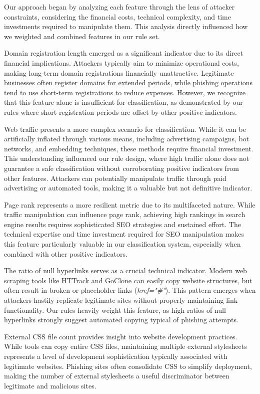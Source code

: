 \documentclass{article}
\begin{document}
Our approach began by analyzing each feature through the lens of attacker constraints, considering the financial costs, technical complexity, and time investments required to manipulate them. This analysis directly influenced how we weighted and combined features in our rule set.

Domain registration length emerged as a significant indicator due to its direct financial implications. Attackers typically aim to minimize operational costs, making long-term domain registrations financially unattractive. Legitimate businesses often register domains for extended periods, while phishing operations tend to use short-term registrations to reduce expenses. However, we recognize that this feature alone is insufficient for classification, as demonstrated by our rules where short registration periods are offset by other positive indicators.

Web traffic presents a more complex scenario for classification. While it can be artificially inflated through various means, including advertising campaigns, bot networks, and embedding techniques, these methods require financial investment. This understanding influenced our rule design, where high traffic alone does not guarantee a safe classification without corroborating positive indicators from other features. Attackers can potentially manipulate traffic through paid advertising or automated tools, making it a valuable but not definitive indicator.

Page rank represents a more resilient metric due to its multifaceted nature. While traffic manipulation can influence page rank, achieving high rankings in search engine results requires sophisticated SEO strategies and sustained effort. The technical expertise and time investment required for SEO manipulation makes this feature particularly valuable in our classification system, especially when combined with other positive indicators.

The ratio of null hyperlinks serves as a crucial technical indicator. Modern web scraping tools like HTTrack \cite{httrack} and GoClone \cite{goclone} can easily copy website structures, but often result in broken or placeholder links (\textit{href="\#"}). This pattern emerges when attackers hastily replicate legitimate sites without properly maintaining link functionality. Our rules heavily weight this feature, as high ratios of null hyperlinks strongly suggest automated copying typical of phishing attempts.

External CSS file count provides insight into website development practices. While tools can copy entire CSS files, maintaining multiple external stylesheets represents a level of development sophistication typically associated with legitimate websites. Phishing sites often consolidate CSS to simplify deployment, making the number of external stylesheets a useful discriminator between legitimate and malicious sites.
\end{document}
